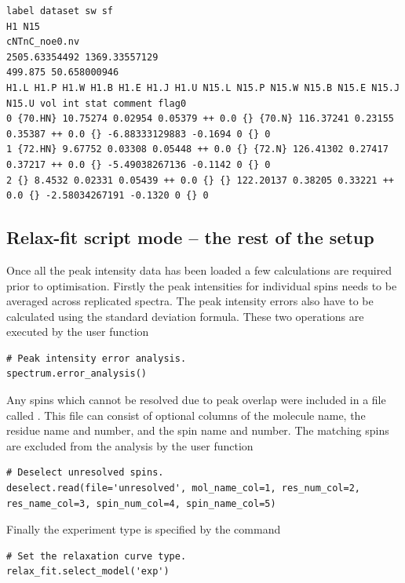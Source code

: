 {\tiny \begin{verbatim}
label dataset sw sf
H1 N15
cNTnC_noe0.nv
2505.63354492 1369.33557129
499.875 50.658000946
H1.L H1.P H1.W H1.B H1.E H1.J H1.U N15.L N15.P N15.W N15.B N15.E N15.J N15.U vol int stat comment flag0
0 {70.HN} 10.75274 0.02954 0.05379 ++ 0.0 {} {70.N} 116.37241 0.23155 0.35387 ++ 0.0 {} -6.88333129883 -0.1694 0 {} 0
1 {72.HN} 9.67752 0.03308 0.05448 ++ 0.0 {} {72.N} 126.41302 0.27417 0.37217 ++ 0.0 {} -5.49038267136 -0.1142 0 {} 0
2 {} 8.4532 0.02331 0.05439 ++ 0.0 {} {} 122.20137 0.38205 0.33221 ++ 0.0 {} -2.58034267191 -0.1320 0 {} 0
\end{verbatim}}



\subsection{Relax-fit script mode -- the rest of the setup} \label{sect: Rx setup fin}

Once all the peak intensity data has been loaded a few calculations are required prior to optimisation.
Firstly the peak intensities for individual spins needs to be averaged across replicated spectra.
The peak intensity errors also have to be calculated using the standard deviation formula.
These two operations are executed by the user function

\begin{lstlisting}[firstnumber=53]
# Peak intensity error analysis.
spectrum.error_analysis()
\end{lstlisting}

Any spins which cannot be resolved due to peak overlap were included in a file called .
This file can consist of optional columns of the molecule name, the residue name and number, and the spin name and number.
The matching spins are excluded from the analysis by the user function

\begin{lstlisting}[firstnumber=56]
# Deselect unresolved spins.
deselect.read(file='unresolved', mol_name_col=1, res_num_col=2, res_name_col=3, spin_num_col=4, spin_name_col=5)
\end{lstlisting}

Finally the experiment type is specified by the command

\begin{lstlisting}[firstnumber=59]
# Set the relaxation curve type.
relax_fit.select_model('exp')
\end{lstlisting}

